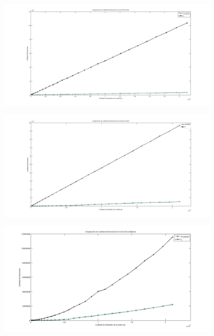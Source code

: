 \documentclass[10pt, a4paper]{article}
\begin{document}
\begin{figure}[H] %
\begin{center}
\includegraphics[width=500pt]{../imgs/comparacion_dividir.jpg}
\end{center}
\end{figure}

\begin{figure}[H] %
\begin{center}
\includegraphics[width=500pt]{../imgs/comparacion_copiar.jpg}
\end{center}
\end{figure}

\begin{figure}[H] %
\begin{center}
\includegraphics[width=500pt]{../imgs/comparacion_multiplicar.jpg}
\end{center}
\end{figure}
\end{document}
